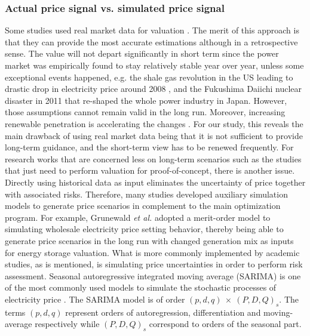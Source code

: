 \subsubsection{Actual price signal vs. simulated price signal}

Some studies used real market data for valuation \cite{Walawalkar2007,Sioshansi2009,Byrne2012,Bradbury2014,McConnell2015,Berrada2016,Salles2017}. The merit of this approach is that they can provide the most accurate estimations although in a retrospective sense. The value will not depart significantly in short term since the power market was empirically found to stay relatively stable year over year, unless some exceptional events happened, e.g. the shale gas revolution in the US leading to drastic drop in electricity price around 2008 \cite{Brown2015,Salles2017}, and the Fukushima Daiichi nuclear disaster in 2011 that re-shaped the whole power industry in Japan. However, those assumptions cannot remain valid in the long run. Moreover, increasing renewable penetration is accelerating the changes \cite{Woo2011,Gelabert2011,Mulder2013,Forrest2013,Wurzburg2013,Clo2015,Cludius2014}. 
For our study, this reveals the main drawback of using real market data being that it is not sufficient to provide long-term guidance, and the short-term view has to be renewed frequently. For research works that are concerned less on long-term scenarios such as the studies that just need to perform valuation for proof-of-concept, there is another issue. Directly using historical data as input eliminates the uncertainty of price together with associated risks.
Therefore, many studies developed auxiliary simulation models to generate price scenarios in complement to the main optimization program. For example, Grunewald \textit{et al.} \cite{Grunewald2012a} adopted a merit-order model to simulating wholesale electricity price setting behavior, thereby being able to generate price scenarios in the long run with changed generation mix as inputs for energy storage valuation. What is more commonly implemented by academic studies, as is mentioned, is simulating price uncertainties  in order to perform risk assessment. Seasonal autoregressive integrated moving average (SARIMA) is one of the most commonly used models to simulate the stochastic processes of electricity price \cite{Weron2014,Ziel2015,Mahmoudi2017,Alipour2017}. The SARIMA model is of order $(p,d,q)~\times~(P,D,Q)_s$. The terms $(p,d,q)$ represent orders of autoregression, differentiation and moving-average respectively while $(P,D,Q)_s$ correspond to orders of the seasonal part.
